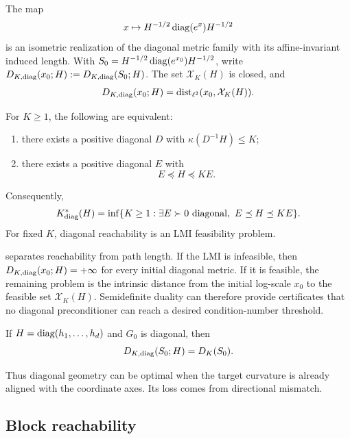 \begin{lemma}
\label{lem:diag-distance-identity}
The map
\[
  x\mapsto H^{-1/2}\operatorname{diag}(e^x)H^{-1/2}
\]
is an isometric realization of the diagonal metric family with its
affine-invariant induced length.  With
\(S_0=H^{-1/2}\operatorname{diag}(e^{x_0})H^{-1/2}\), write
\(D_{K,\operatorname{diag}}(x_0;H):=D_{K,\operatorname{diag}}(S_0;H)\).  The set
\(\mathcal X_K(H)\) is closed, and
\[
  D_{K,\operatorname{diag}}(x_0;H)=\operatorname{dist}_{\ell^2}(x_0,\mathcal X_K(H)).
\]
\end{lemma}

\begin{theorem}
\label{thm:diag-lmi}
For \(K\ge1\), the following are equivalent:
\begin{enumerate}[leftmargin=*,itemsep=0.1em]
  \item there exists a positive diagonal \(D\) with
  \(\kappa(D^{-1}H)\le K\);
  \item there exists a positive diagonal \(E\) with
  \[
    E\preceq H\preceq K E.
  \]
\end{enumerate}
Consequently,
\[
  K_{\operatorname{diag}}^\ast(H)
  =
  \inf\{K\ge1:\exists E\succ0\ \mathrm{diagonal},\ E\preceq H\preceq KE\}.
\]
For fixed \(K\), diagonal reachability is an LMI feasibility problem.
\end{theorem}

\begin{remark}
 separates reachability from path length. If the LMI is
infeasible, then \(D_{K,\operatorname{diag}}(x_0;H)=+\infty\) for every initial diagonal
metric. If it is feasible, the remaining problem is the intrinsic distance from
the initial log-scale \(x_0\) to the feasible set \(\mathcal X_K(H)\).
Semidefinite duality can therefore provide certificates that no diagonal
preconditioner can reach a desired condition-number threshold.
\end{remark}

\begin{corollary}
\label{cor:diag-aligned}
If \(H=\operatorname{diag}(h_1,\ldots,h_d)\) and \(G_0\) is diagonal, then
\[
  D_{K,\operatorname{diag}}(S_0;H)=D_K(S_0).
\]
\end{corollary}

Thus diagonal geometry can be optimal when the target curvature is already
aligned with the coordinate axes. Its loss comes from directional mismatch.

\subsection{Block reachability}

